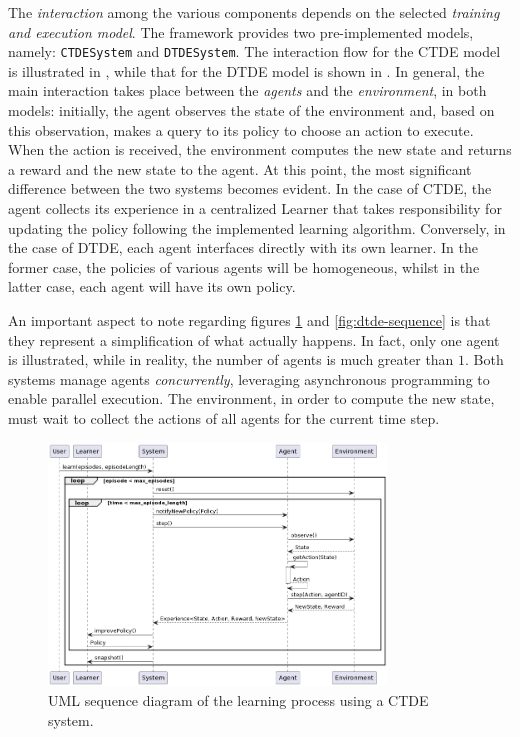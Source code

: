 \documentclass[12pt,a4paper,openright,twoside]{book}
\begin{document}
The \emph{interaction} among the various components depends on the selected \emph{training and execution model}. 
    The framework provides two pre-implemented models, namely: \texttt{CTDESystem} and \texttt{DTDESystem}. 
    The interaction flow for the CTDE model is illustrated in , while that for the DTDE model is shown in
    . In general, the main interaction takes place between the \emph{agents} and the \emph{environment}, in both models: 
    initially, the agent observes the state of the environment and, based on this observation, 
    makes a query to its policy to choose an action to execute. When the action is received, the environment computes 
    the new state and returns a reward and the new state to the agent.
    At this point, the most significant difference between the two systems becomes evident. In the case of CTDE, the agent collects its experience 
    in a centralized Learner that takes responsibility for updating the policy following the implemented learning algorithm. Conversely, in the case of 
    DTDE, each agent interfaces directly with its own learner. In the former case, the policies of various agents will be homogeneous, 
    whilst in the latter case, each agent will have its own policy.

An important aspect to note regarding figures \ref{fig:ctde-sequence} and \ref{fig:dtde-sequence} is that they represent a simplification of what actually happens. 
    In fact, only one agent is illustrated, while in reality, the number of agents is much greater than $1$. Both systems manage agents \emph{concurrently}, 
    leveraging asynchronous programming to enable parallel execution. The environment, in order to compute the new state,
     must wait to collect the actions of all agents for the current time step.

\begin{figure}[t]
    \centering
    \includegraphics[width=0.8\textwidth]{figures/CTDE-System-Sequence-Diagram.png}
    \caption{UML sequence diagram of the learning process using a CTDE system.}
    \label{fig:ctde-sequence}
\end{figure}
\end{document}
